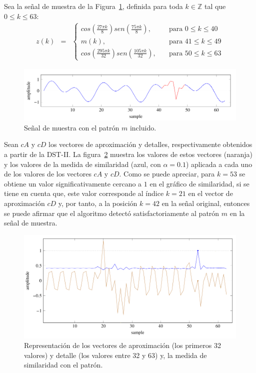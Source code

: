 \par Sea la se\~nal de muestra de la Figura~\ref{signal-1d}, definida para toda $k\in \mathbb{Z}$ tal que $0\leq k \leq 63$:
\begin{eqnarray}
z(k)&=&\left\{\begin{array}{ll}
cos\left(\frac{27\pi k}{8}\right)sen\left(\frac{75\pi k}{8}\right),&\quad\mbox{para $0\leq k \leq 40$}\\
m(k),&\quad\mbox{para $41 \leq k \leq 49$}\\
cos\left(\frac{295\pi k}{32}\right)sen\left(\frac{105\pi k}{32}\right),&\quad\mbox{para $50 \leq k \leq 63$}
\end{array}\right.\nonumber
\end{eqnarray}

\begin{figure}[h]
\center
\includegraphics[scale=.4]{Graphics/Signal.png}
\caption{Se\~nal de muestra con el patr\'on $m$ incluido.}
\label{signal-1d}
\end{figure}

\par Sean $cA$ y $cD$ los vectores de aproximaci\'on y detalles, respectivamente obtenidos a partir de la DST-II. La figura~\ref{similaridad-1d} muestra los valores de estos vectores (naranja) y los valores de la medida de similaridad (azul, con $\alpha=0.1$) aplicada a cada uno de los valores de los vectores $cA$ y $cD$. Como se puede apreciar, para $k=53$ se obtiene un valor significativamente cercano a $1$ en el gr\'afico de similaridad, si se tiene en cuenta que, este valor corresponde al \'indice $k=21$ en el vector de aproximaci\'on $cD$ y, por tanto, a la posici\'on $k=42$ en la se\~nal original, entonces se puede afirmar que el algoritmo detect\'o satisfactoriamente al patr\'on $m$ en la se\~nal de muestra.

\begin{figure}[h]
\center
\includegraphics[scale=.4]{Graphics/Similarity.png}
\caption{Representaci\'on de los vectores de aproximaci\'on (los primeros 32 valores) y detalle (los valores entre 32 y 63) y, la medida de similaridad con el patr\'on.}
\label{similaridad-1d}
\end{figure}

